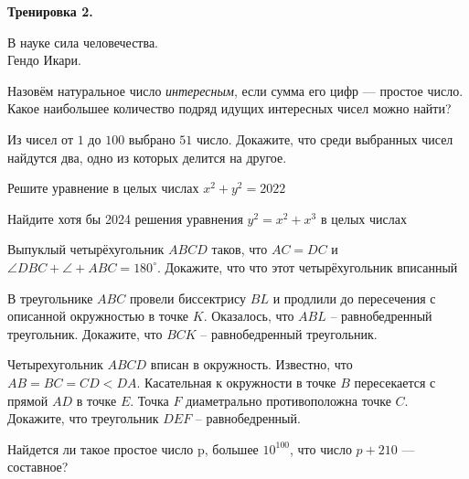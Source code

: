 \hspace{3mm}

\centerline{\bf \Huge Тренировка 2.}

\begin{flushright}
        \scriptsize{В науке сила человечества.\\ Гендо Икари.}
\end{flushright}


Назовём натуральное число \textit{интересным}, если сумма его цифр --- простое число. Какое наибольшее количество подряд идущих интересных чисел можно найти?

Из чисел от $1$ до $100$ выбрано  $51$  число. Докажите, что среди выбранных чисел найдутся два, одно из которых делится на другое.

Решите уравнение в целых числах $x^2 + y^2 = 2022$

Найдите хотя бы 2024 решения уравнения $y^2 = x^2 + x^3$ в целых числах

Выпуклый четырёхугольник $ABCD$ таков, что $AC = DC$ и $\angle DBC + \angle + ABC = 180^{\circ}$. Докажите, что что этот четырёхугольник вписанный

В треугольнике $ABC$ провели биссектрису $BL$ и продлили до пересечения с описанной окружностью в точке $K$. Оказалось, что $ABL$ -- равнобедренный треугольник. Докажите, что $BCK$ -- равнобедренный треугольник.

Четырехугольник $ABCD$ вписан в окружность. Известно, что $AB = BC = CD < DA$. Касательная к окружности в точке $B$ пересекается с прямой $AD$ в точке $E$. Точка $F$ диаметрально противоположна точке $C$. Докажите, что треугольник $DEF$ -- равнобедренный.

Найдется ли такое простое число p, большее $10^{100}$, что число $p + 210$ --- составное?

